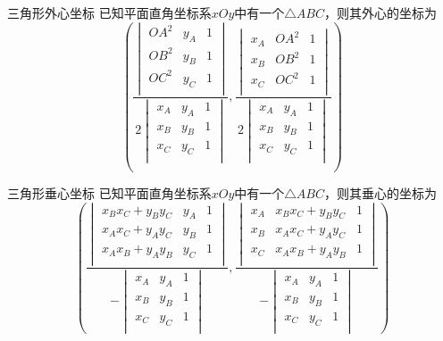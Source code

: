 \begin{example}{三角形外心坐标}{}
    已知平面直角坐标系$xOy$中有一个$\triangle{ABC}$，则其外心的坐标为\[
    \left(\dfrac{\begin{vmatrix}
    OA^2 & y_A & 1\\
    OB^2 & y_B & 1\\
    OC^2 & y_C & 1\\
\end{vmatrix}}{2\begin{vmatrix}
    x_A & y_A & 1\\
    x_B & y_B & 1\\
    x_C & y_C & 1\\
\end{vmatrix}},\dfrac{\begin{vmatrix}
    x_A & OA^2 & 1\\
    x_B & OB^2 & 1\\
    x_C & OC^2 & 1\\
\end{vmatrix}}{2\begin{vmatrix}
    x_A & y_A & 1\\
    x_B & y_B & 1\\
    x_C & y_C & 1\\
\end{vmatrix}}\right)
\]\end{example}
\begin{solution}

\end{solution}
\begin{example}{三角形垂心坐标}{}
    已知平面直角坐标系$xOy$中有一个$\triangle{ABC}$，则其垂心的坐标为\[
    \left(\dfrac{\begin{vmatrix}
    x_Bx_C+y_By_C & y_A & 1\\
    x_Ax_C+y_Ay_C & y_B & 1\\
    x_Ax_B+y_Ay_B & y_C & 1\\
    \end{vmatrix}}{-\begin{vmatrix}
    x_A & y_A & 1\\
    x_B & y_B & 1\\
    x_C & y_C & 1\\
    \end{vmatrix}},\dfrac{\begin{vmatrix}
    x_A & x_Bx_C+y_By_C & 1\\
    x_B & x_Ax_C+y_Ay_C & 1\\
    x_C & x_Ax_B+y_Ay_B & 1\\
    \end{vmatrix}}{-\begin{vmatrix}
    x_A & y_A & 1\\
    x_B & y_B & 1\\
    x_C & y_C & 1\\
    \end{vmatrix}}\right)\]
\end{example}
